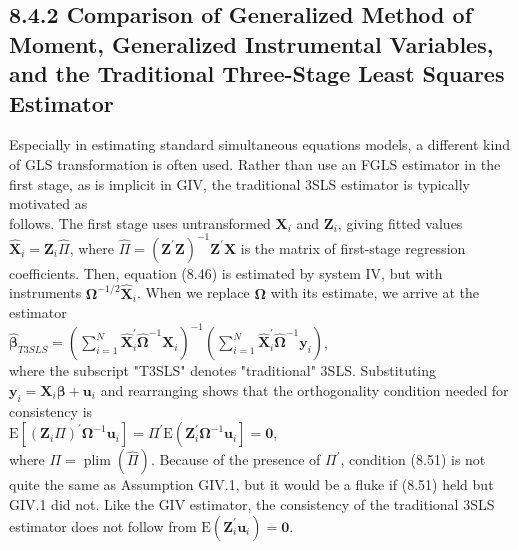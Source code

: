 \documentclass[10pt]{article}
\begin{document}
\subsection*{8.4.2 Comparison of Generalized Method of Moment, Generalized Instrumental Variables, and the Traditional Three-Stage Least Squares Estimator}
Especially in estimating standard simultaneous equations models, a different kind of GLS transformation is often used. Rather than use an FGLS estimator in the first stage, as is implicit in GIV, the traditional 3SLS estimator is typically motivated as\\
follows. The first stage uses untransformed $\mathbf{X}_{i}$ and $\mathbf{Z}_{i}$, giving fitted values $\hat{\mathbf{X}}_{i}=\mathbf{Z}_{i} \hat{\Pi}$, where $\hat{\Pi}=\left(\mathbf{Z}^{\prime} \mathbf{Z}\right)^{-1} \mathbf{Z}^{\prime} \mathbf{X}$ is the matrix of first-stage regression coefficients. Then, equation (8.46) is estimated by system IV, but with instruments $\boldsymbol{\Omega}^{-1 / 2} \hat{\mathbf{X}}_{i}$. When we replace $\boldsymbol{\Omega}$ with its estimate, we arrive at the estimator\\
$\hat{\boldsymbol{\beta}}_{T 3 S L S}=\left(\sum_{i=1}^{N} \hat{\mathbf{X}}_{i}^{\prime} \hat{\boldsymbol{\Omega}}^{-1} \mathbf{X}_{i}\right)^{-1}\left(\sum_{i=1}^{N} \hat{\mathbf{X}}_{i}^{\prime} \hat{\boldsymbol{\Omega}}^{-1} \mathbf{y}_{i}\right)$,\\
where the subscript "T3SLS" denotes "traditional" 3SLS. Substituting $\mathbf{y}_{i}=\mathbf{X}_{i} \boldsymbol{\beta}+\mathbf{u}_{i}$ and rearranging shows that the orthogonality condition needed for consistency is\\
$\mathrm{E}\left[\left(\mathbf{Z}_{i} \Pi\right)^{\prime} \boldsymbol{\Omega}^{-1} \mathbf{u}_{i}\right]=\Pi^{\prime} \mathrm{E}\left(\mathbf{Z}_{i}^{\prime} \boldsymbol{\Omega}^{-1} \mathbf{u}_{i}\right]=\mathbf{0}$,\\
where $\Pi=\operatorname{plim}(\hat{\Pi})$. Because of the presence of $\Pi^{\prime}$, condition (8.51) is not quite the same as Assumption GIV.1, but it would be a fluke if (8.51) held but GIV.1 did not. Like the GIV estimator, the consistency of the traditional 3SLS estimator does not follow from $\mathrm{E}\left(\mathbf{Z}_{i}^{\prime} \mathbf{u}_{i}\right)=\mathbf{0}$.
\end{document}

